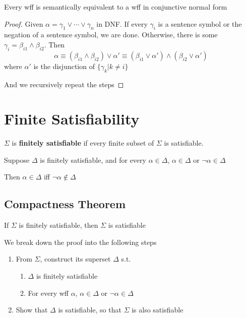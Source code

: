 \begin{theorem}
    \label{thm:CompletenessOfCNF}
    Every wff is semantically equivalent to a wff in conjunctive normal form
\end{theorem}
\begin{proof}
    Given $\alpha=\gamma_1\vee\cdots\vee\gamma_n$ in DNF. If every $\gamma_i$ is a sentence symbol or the negation of a sentence symbol, we are done. Otherwise, there is some $\gamma_i = \beta_{i1}\wedge\beta_{i2}$. Then
    \[ \alpha \equiv (\beta_{i1} \wedge \beta_{i2}) \vee \alpha' \equiv (\beta_{i1}\vee\alpha') \wedge (\beta_{i2}\vee\alpha') \]
    where $\alpha'$ is the disjunction of $\{\gamma_k|k \neq i\}$

    And we recursively repeat the steps
\end{proof}

\section{Finite Satisfiability}
\label{sec:FiniteSatisfiability}

\begin{definition}
    \label{def:FiniteSatisfiability}
    $\Sigma$ is \textbf{finitely satisfiable} if every finite subset of $\Sigma$ is satisfiable.
\end{definition}
\begin{remark}
    Suppose $\Delta$ is finitely satisfiable, and for every $\alpha\in\Delta$, $\alpha\in\Delta$ or $\neg\alpha\in\Delta$

    Then $\alpha\in\Delta$ iff $\neg\alpha\notin\Delta$
\end{remark}


\subsection{Compactness Theorem}

\begin{theorem}
    \label{thm:CompactnessTheorem}
    If $\Sigma$ is finitely satisfiable, then $\Sigma$ is satisfiable
\end{theorem}
\begin{sketchproof}
    We break down the proof into the following steps
    \begin{enumerate}
        \item From $\Sigma$, construct its superset $\Delta$ s.t.
        \begin{enumerate}
            \item $\Delta$ is finitely satisfiable
            \item For every wff $\alpha$, $\alpha\in\Delta$ or $\neg\alpha\in\Delta$
        \end{enumerate}
        \item Show that $\Delta$ is satisfiable, so that $\Sigma$ is also satisfiable
    \end{enumerate}
\end{sketchproof}

